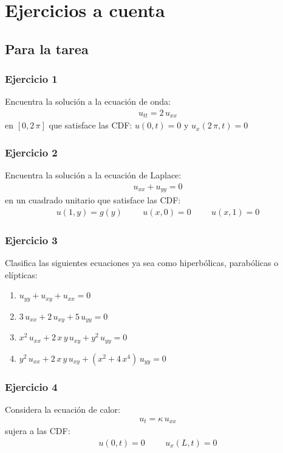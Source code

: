 \documentclass[12pt]{beamer}
\begin{document}
\section{Ejercicios a cuenta}
\subsection{Para la tarea}

\begin{frame}
\frametitle{Ejercicio 1}
Encuentra la solución a la ecuación de onda:
\begin{align*}
  u_{tt} = 2 \, u_{xx} 
\end{align*}
en $[0, 2 \, \pi]$ que satisface las CDF: $u (0, t) = 0$ y $u_{x} (2 \, \pi, t) = 0$
\end{frame}
\begin{frame}
\frametitle{Ejercicio 2}
Encuentra la solución a la ecuación de Laplace:
\begin{align*}
  u_{xx} + u_{yy} = 0
\end{align*}
en un cuadrado unitario que satisface las CDF:
\begin{align*}
  u (1, y) = g (y) \hspace{1cm} u (x, 0) = 0  \hspace{1cm} u (x, 1) = 0
\end{align*}
\end{frame}
\begin{frame}
\frametitle{Ejercicio 3}
Clasifica las siguientes ecuaciones ya sea como hiperbólicas, parabólicas o elípticas:
\begin{enumerate}
\item $u_{yy} + u_{xy} + u_{xx} = 0$
\item $3 \, u_{xx} + 2 \, u_{xy} + 5 \, u_{yy} = 0$
\item $x^{2} \, u_{xx} + 2 \, x \, y \, u_{xy} + y^{2} \, u_{yy} = 0$
\item $y^{2} \, u_{xx} + 2 \, x \, y \, u_{xy} + \left( x^{2} + 4 \, x^{4} \right) \, u_{yy} = 0$
\end{enumerate}
\end{frame}
\begin{frame}
\frametitle{Ejercicio 4}
Considera la ecuación de calor:
\begin{align*}
  u_{t} = \kappa \, u_{xx}
\end{align*}
sujera a las CDF:
\begin{align*}
  u(0, t) = 0 \hspace{1cm} u_{x} (L, t) = 0
\end{align*}
\end{frame}
\end{document}

